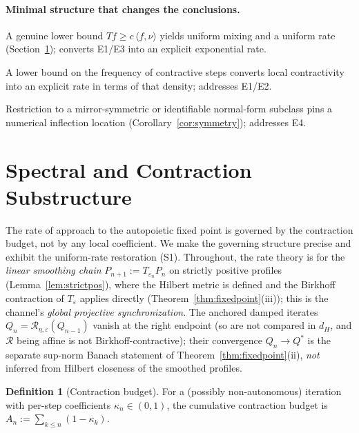 \documentclass[11pt]{article}
\theoremstyle{plain}
\theoremstyle{definition}
\newtheorem{definition}[theorem]{Definition}
\theoremstyle{remark}
\newcommand{\ip}[2]{\langle #1, #2\rangle}
\newcommand{\Rc}{\mathcal R}
\begin{document}
\paragraph{Minimal structure that changes the conclusions.}
\begin{description}[leftmargin=2.4em,style=nextline]
\item[\textnormal{(S1) Uniform minorization (Doeblin).}] A genuine lower bound $Tf\ge c\,\ip{f}{\nu}$ yields uniform mixing and a uniform rate (Section~\ref{sec:spectral}); converts E1/E3 into an explicit exponential rate.
\item[\textnormal{(S2) Time-structure (good-step density / bounded gaps).}] A lower bound on the frequency of contractive steps converts local contractivity into an explicit rate in terms of that density; addresses E1/E2.
\item[\textnormal{(S3) Symmetry / identifiability.}] Restriction to a mirror-symmetric or identifiable normal-form subclass pins a numerical inflection location (Corollary~\ref{cor:symmetry}); addresses E4.
\end{description}

\section{Spectral and Contraction Substructure}\label{sec:spectral}

The rate of approach to the autopoietic fixed point is governed by the contraction budget, not by any local coefficient. We make the governing structure precise and exhibit the uniform-rate restoration (S1). Throughout, the rate theory is for the \emph{linear smoothing chain} $P_{n+1}:=T_{\varepsilon_n}P_n$ on strictly positive profiles (Lemma~\ref{lem:strictpos}), where the Hilbert metric is defined and the Birkhoff contraction of $T_\varepsilon$ applies directly (Theorem~\ref{thm:fixedpoint}(iii)); this is the channel's \emph{global projective synchronization}. The anchored damped iterates $Q_n=\Rc_{\eta,\varepsilon}(Q_{n-1})$ vanish at the right endpoint (so are not compared in $d_H$, and $\Rc$ being affine is not Birkhoff-contractive); their convergence $Q_n\to Q^*$ is the separate sup-norm Banach statement of Theorem~\ref{thm:fixedpoint}(ii), \emph{not} inferred from Hilbert closeness of the smoothed profiles.

\begin{definition}[Contraction budget]
For a (possibly non-autonomous) iteration with per-step coefficients $\kappa_n\in(0,1)$, the cumulative contraction budget is $A_n:=\sum_{k\le n}(1-\kappa_k)$.
\end{definition}
\end{document}
